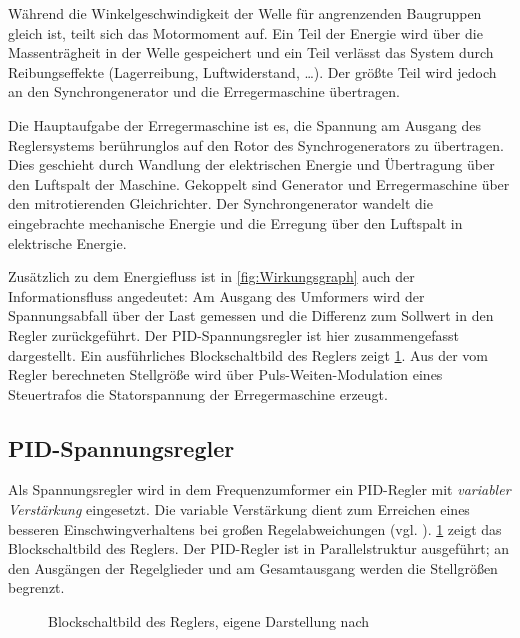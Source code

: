 Während die Winkelgeschwindigkeit der Welle für angrenzenden Baugruppen gleich ist, teilt sich das Motormoment auf. Ein Teil der Energie wird über die Massenträgheit in der Welle gespeichert und ein Teil verlässt das System durch Reibungseffekte (Lagerreibung, Luftwiderstand, \ldots). Der größte Teil wird jedoch an den Synchrongenerator und die Erregermaschine übertragen.

Die Hauptaufgabe der Erregermaschine ist es, die Spannung am Ausgang des Reglersystems berührunglos auf den Rotor des Synchrogenerators zu übertragen. Dies geschieht durch Wandlung der elektrischen Energie und Übertragung über den Luftspalt der Maschine. Gekoppelt sind Generator und Erregermaschine über den mitrotierenden Gleichrichter. Der Synchrongenerator wandelt die eingebrachte mechanische Energie und die Erregung über den Luftspalt in elektrische Energie.

Zusätzlich zu dem Energiefluss ist in \cref{fig:Wirkungsgraph} auch der Informationsfluss angedeutet: Am Ausgang des Umformers wird der Spannungsabfall über der Last gemessen und die Differenz zum Sollwert in den Regler zurückgeführt. Der PID-Spannungsregler ist hier zusammengefasst dargestellt. Ein ausführliches Blockschaltbild des Reglers zeigt \cref{fig:Blockschaltbild_Regler}. Aus der vom Regler berechneten Stellgröße wird über Puls-Weiten-Modulation eines Steuertrafos die Statorspannung der Erregermaschine erzeugt.

\subsection{PID-Spannungsregler}\label{sec:pid-spannungsregler}

Als Spannungsregler wird in dem Frequenzumformer ein PID-Regler mit \emph{variabler Verstärkung} eingesetzt. Die variable Verstärkung dient zum Erreichen eines besseren Einschwingverhaltens bei großen Regelabweichungen (vgl. \cite{DigitalerSpannungsreglerSoftwaredokumentation}). \cref{fig:Blockschaltbild_Regler} zeigt das Blockschaltbild des Reglers. Der PID-Regler ist in Parallelstruktur ausgeführt; an den Ausgängen der Regelglieder und am Gesamtausgang werden die Stellgrößen begrenzt. 

\begin{figure}
    \centering
    
    \caption{Blockschaltbild des Reglers, eigene Darstellung nach \cite{piller_power_systems_gen_bsb11_1999}}
    \label{fig:Blockschaltbild_Regler}
\end{figure}

